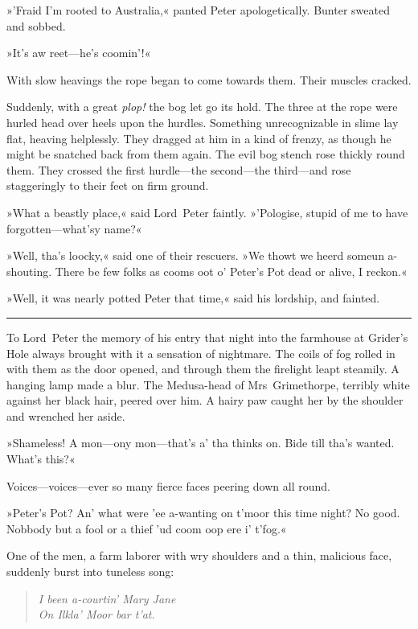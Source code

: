 »'Fraid I'm rooted to Australia,« panted Peter apologetically. Bunter sweated and sobbed.

»It's aw reet—he's coomin'!«

With slow heavings the rope began to come towards them. Their muscles cracked.

Suddenly, with a great \textit{plop!} the bog let go its hold. The three at the rope were hurled head over heels upon the hurdles. Something unrecognizable in slime lay flat, heaving helplessly. They dragged at him in a kind of frenzy, as though he might be snatched back from them again. The evil bog stench rose thickly round them. They crossed the first hurdle—the second—the third—and rose staggeringly to their feet on firm ground.

»What a beastly place,« said Lord~Peter faintly. »'Pologise, stupid of me to have forgotten—what'sy name?«

»Well, tha's loocky,« said one of their rescuers. »We thowt we heerd someun a-shouting. There be few folks as cooms oot o' Peter's Pot dead or alive, I reckon.«

»Well, it was nearly potted Peter that time,« said his lordship, and fainted. 

\noindent\hfil\rule{0.5\textwidth}{.4pt}\hfil 

To Lord~Peter the memory of his entry that night into the farmhouse at Grider's Hole always brought with it a sensation of nightmare.  The coils of fog rolled in with them as the door opened, and through them the firelight leapt steamily. A hanging lamp made a blur. The Medusa-head of Mrs~Grimethorpe, terribly white against her black hair, peered over him. A hairy paw caught her by the shoulder and wrenched her aside.

»Shameless! A mon—ony mon—that's a' tha thinks on. Bide till tha's wanted. What's this?«

Voices—voices—ever so many fierce faces peering down all round.

»Peter's Pot? An' what were 'ee a-wanting on t'moor this time night? No good. Nobbody but a fool or a thief 'ud coom oop ere i' t'fog.«

One of the men, a farm laborer with wry shoulders and a thin, malicious face, suddenly burst into tuneless song: 

\begin{quote}\itshape
I been a-courtin' Mary Jane\\
On Ilkla' Moor bar t'at.
\end{quote}

